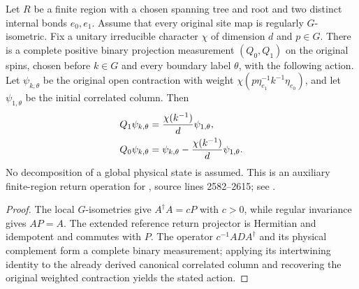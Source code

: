 \begin{lemma}
    \label{thm:peps_original_charge_pair_return_measurement}
    \leanok
    Let $R$ be a finite region with a chosen spanning tree and root and two
    distinct internal bonds $e_0,e_1$. Assume that every original site map
    is regularly $G$-isometric. Fix a unitary irreducible character $\chi$
    of dimension $d$ and $p\in G$.
    There is a complete positive binary projection measurement $(Q_0,Q_1)$
    on the original spins, chosen before $k\in G$ and every boundary
    label $\theta$, with the following action. Let $\psi_{k,\theta}$ be the
    original open contraction with weight
    $\chi(p\eta_{e_1}^{-1}k^{-1}\eta_{e_0})$, and let
    $\psi_{1,\theta}$ be the initial correlated column. Then
    \begin{align}
        Q_1\psi_{k,\theta} & =\frac{\chi(k^{-1})}{d}\psi_{1,\theta},\notag \\
        Q_0\psi_{k,\theta} & =\psi_{k,\theta}
        -\frac{\chi(k^{-1})}{d}\psi_{1,\theta}.\notag
    \end{align}
    No decomposition of a global physical state is assumed. This is an
    auxiliary finite-region return operation for
    \cite[Section~6.6]{Schuch2010PEPS}, source lines 2582--2615; see
    \cite{gap:rmp_peps_quantum_double_g_isometry}.
\end{lemma}
\begin{proof}
    \leanok
    The local $G$-isometries give $A^\dagger A=cP$ with $c>0$, while
    regular invariance gives $AP=A$. The extended reference return
    projector is Hermitian and idempotent and commutes with $P$.
    The operator $c^{-1}ADA^\dagger$ and its physical complement form a
    complete binary measurement; applying its intertwining identity to the
    already derived canonical correlated column and recovering the
    original weighted contraction yields the stated action.
\end{proof}

